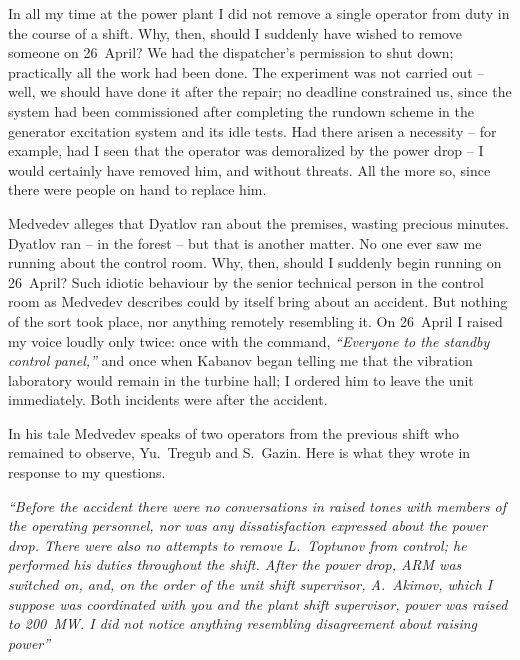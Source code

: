 \documentclass[openright]{bookest}
\begin{document}
In all my time at the power plant I did not remove a single operator from duty in the course of a shift. Why, then, should I suddenly have wished to remove someone on 26~April? We had the dispatcher's permission to shut down; practically all the work had been done. The experiment was not carried out -- well, we should have done it after the repair; no deadline constrained us, since the system had been commissioned after completing the rundown scheme in the generator excitation system and its idle tests. Had there arisen a necessity -- for example, had I seen that the operator was demoralized by the power drop -- I would certainly have removed him, and without threats. All the more so, since there were people on hand to replace him.

Medvedev alleges that Dyatlov ran about the premises, wasting precious minutes. Dyatlov ran -- in the forest -- but that is another matter. No one ever saw me running about the control room. Why, then, should I suddenly begin running on 26~April? Such idiotic behaviour by the senior technical person in the control room as Medvedev describes could by itself bring about an accident. But nothing of the sort took place, nor anything remotely resembling it. On 26~April I raised my voice loudly only twice: once with the command, \textit{``Everyone to the standby control panel,''} and once when Kabanov began telling me that the vibration laboratory would remain in the turbine hall; I ordered him to leave the unit immediately. Both incidents were after the accident.

In his tale Medvedev speaks of two operators from the previous shift who remained to observe, Yu.~Tregub and S.~Gazin. Here is what they wrote in response to my questions.

\begin{personal}
\textit{``Before the accident there were no conversations in raised tones with members of the operating personnel, nor was any dissatisfaction expressed about the power drop. There were also no attempts to remove L.~Toptunov from control; he performed his duties throughout the shift. After the power drop, ARM was switched on, and, on the order of the unit shift supervisor, A.~Akimov, which I suppose was coordinated with you and the plant shift supervisor, power was raised to \qty{200}{\mega\watt}. I did not notice anything resembling disagreement about raising power''}
\end{personal}
\end{document}

